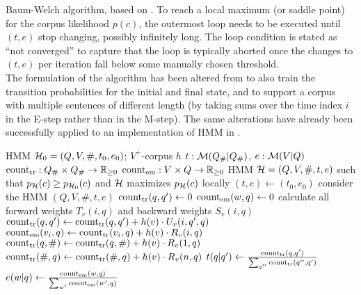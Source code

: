 \begin{algorithm}[p!]
 \caption{Baum-Welch algorithm, based on \cite[p.~226]{jm09}. To reach a local
 maximum (or saddle point) for the corpus likelihood $p(c)$, the outermost loop
 needs to be executed until $(t,e)$ stop changing, possibly infinitely long.
 The loop condition is stated as ``not converged'' to capture that the loop is
 typically aborted once the changes to $(t,e)$ per iteration fall below some
 manually chosen threshold.\\[1em]
 The formulation of the algorithm has been altered from \cite{jm09} to also
 train the transition probabilities for the initial and final state, and to
 support a corpus with multiple sentences of different length (by taking sums
 over the time index $i$ in the E-step rather than in the M-step). The same
 alterations have already been successfully applied to an implementation of HMM
 in \cite{nel13}. \label{alg:bw-vogler}}
 \begin{algorithmic}[1]
  \algorithmheader[Input:] HMM $\mathcal H_0 = (Q,V,\#,t_0,e_0)$; $V^+$-corpus $h$
  \algorithmheader[Variables:] $t:\mathcal M(Q_\#|Q_\#)$, $e:\mathcal M(V|Q)$
  \algorithmheader             $\operatorname{count}_\mathrm{tr}: Q_\#\times Q_\#\to\mathbb R_{\geq0}$
  \algorithmheader             $\operatorname{count}_\mathrm{em}: V\times Q\to\mathbb R_{\geq0}$
  \algorithmheader[Output:] HMM $\mathcal H = (Q,V,\#,t,e)$
  \algorithmheader such that $p_\mathcal H(c) \geq p_{\mathcal H_0}(c)$ and $\mathcal H$ maximizes $p_\mathcal H(c)$ locally
  \STATE $(t,e) \leftarrow (t_0,e_0)$
   \STATE consider the HMM $(Q,V,\#,t,e)$
   \STATE $\operatorname{count}_\mathrm{tr}(q,q') \leftarrow 0$ 
   \STATE $\operatorname{count}_\mathrm{em}(w,q) \leftarrow 0$ 
    \STATE calculate all forward weights $T_v(i,q)$ and backward weights $S_v(i,q)$
      \STATE $\operatorname{count}_\mathrm{tr}(q,q') \leftarrow \operatorname{count}_\mathrm{tr}(q,q') + h(v) \cdot U_v(i,q',q)$
     \ENDFOR
    \ENDFOR
      \STATE $\operatorname{count}_\mathrm{em}(v_i,q) \leftarrow \operatorname{count}_\mathrm{tr}(v_i,q) + h(v) \cdot R_v(i,q)$
     \ENDFOR
    \ENDFOR
     \STATE $\operatorname{count}_\mathrm{tr}(q,\#) \leftarrow \operatorname{count}_\mathrm{tr}(q,\#) + h(v) \cdot R_v(1,q)$
     \STATE $\operatorname{count}_\mathrm{tr}(\#,q) \leftarrow \operatorname{count}_\mathrm{tr}(\#,q) + h(v) \cdot R_v(n,q)$
    \ENDFOR
   \ENDFOR
    \STATE $t(q|q') \leftarrow \frac{\operatorname{count}_\mathrm{tr}(q,q')}{\sum_{q''} \operatorname{count}_\mathrm{tr}(q'',q')}$
   \ENDFOR
    \STATE $e(w|q) \leftarrow \frac{\operatorname{count}_\mathrm{em}(w,q)}{\sum_{w'} \operatorname{count}_\mathrm{em}(w',q)}$
   \ENDFOR
  \ENDWHILE
 \end{algorithmic}
\end{algorithm}

